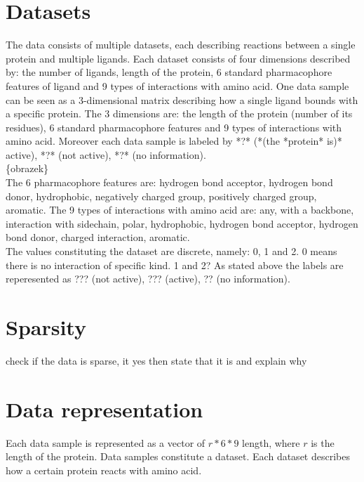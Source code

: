 \documentclass[a4paper,10pt]{report}
\begin{document}
    \section{Datasets}
    The data consists of multiple datasets, each describing reactions between a single protein and multiple ligands. Each dataset consists of four dimensions described by: the number of ligands, length of the protein, 6 standard pharmacophore features of ligand and 9 types of interactions with amino acid\cite{2DSIFT}. One data sample can be seen as a 3-dimensional matrix describing how a single ligand bounds with a specific protein. The 3 dimensions are: the length of the protein (number of its residues), 6 standard pharmacophore features and 9 types of interactions with amino acid. Moreover each data sample is labeled by *?* (*(the *protein* is)* active), *?* (not active), *?* (no information). \\

    \{obrazek\} \\ %
    
    The 6 pharmacophore features are: hydrogen bond acceptor, hydrogen bond donor, hydrophobic, negatively charged group, positively charged group, aromatic. The 9 types of interactions with amino acid are: any, with a backbone, interaction with sidechain, polar, hydrophobic, hydrogen bond acceptor, hydrogen bond donor, charged interaction, aromatic. \\
    
    The values constituting the dataset are discrete, namely: 0, 1 and 2. 0 means there is no interaction of specific kind. 1 and 2? As stated above the labels are reperesented as ??? (not active), ??? (active), ?? (no information).
    
    \section{Sparsity} %
    check if the data is sparse, it yes then state that it is and explain why
    
    \section{Data representation} %
    Each data sample is represented as a vector of $r*6*9$ length, where $r$ is the length of the protein. Data samples constitute a dataset. Each dataset describes how a certain protein reacts with amino acid.\\
    
\end{document}
